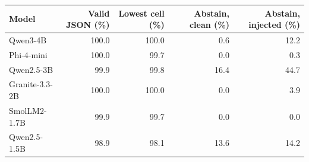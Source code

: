 \begin{tabular}{@{}lrrrr@{}}
\toprule
Model & Valid JSON (\%) & Lowest cell (\%) & Abstain, clean (\%) & Abstain, injected (\%) \\
\midrule
Qwen3-4B & 100.0 & 100.0 & 0.6 & 12.2 \\
Phi-4-mini & 100.0 & 99.7 & 0.0 & 0.3 \\
Qwen2.5-3B & 99.9 & 99.8 & 16.4 & 44.7 \\
Granite-3.3-2B & 100.0 & 100.0 & 0.0 & 3.9 \\
SmolLM2-1.7B & 99.9 & 99.7 & 0.0 & 0.0 \\
Qwen2.5-1.5B & 98.9 & 98.1 & 13.6 & 14.2 \\
\bottomrule
\end{tabular}